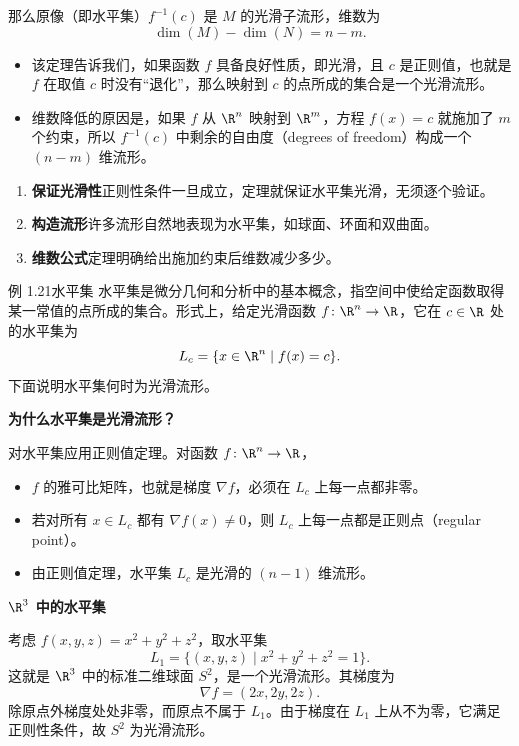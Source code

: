 那么原像（即水平集）$f^{-1}(c)$ 是 $M$ 的光滑子流形，维数为
\[
  \dim(M)-\dim(N)=n-m.
\]

\begin{itemize}
  \item 该定理告诉我们，如果函数 $f$ 具备良好性质，即光滑，且 $c$ 是正则值，也就是 $f$ 在取值 $c$ 时没有“退化”，那么映射到 $c$ 的点所成的集合是一个光滑流形。
  \item 维数降低的原因是，如果 $f$ 从 $\R^n$ 映射到 $\R^m$，方程 $f(x)=c$ 就施加了 $m$ 个约束，所以 $f^{-1}(c)$ 中剩余的自由度（degrees of freedom）构成一个 $(n-m)$ 维流形。
\end{itemize}

\begin{enumerate}
  \item \textbf{保证光滑性}\quad 正则性条件一旦成立，定理就保证水平集光滑，无须逐个验证。
  \item \textbf{构造流形}\quad 许多流形自然地表现为水平集，如球面、环面和双曲面。
  \item \textbf{维数公式}\quad 定理明确给出施加约束后维数减少多少。
\end{enumerate}

\begin{statement}{例 1.21}{水平集}
水平集是微分几何和分析中的基本概念，指空间中使给定函数取得某一常值的点所成的集合。形式上，给定光滑函数 $f\colon\R^n\to\R$，它在 $c\in\R$ 处的水平集为
\[
  L_c=\{x\in\R^n\mid f(x)=c\}.
\]
下面说明水平集何时为光滑流形。

\textbf{为什么水平集是光滑流形？}\par
对水平集应用正则值定理。对函数 $f\colon\R^n\to\R$，
\begin{itemize}
  \item $f$ 的雅可比矩阵，也就是梯度 $\nabla f$，必须在 $L_c$ 上每一点都非零。
  \item 若对所有 $x\in L_c$ 都有 $\nabla f(x)\ne0$，则 $L_c$ 上每一点都是正则点（regular point）。
  \item 由正则值定理，水平集 $L_c$ 是光滑的 $(n-1)$ 维流形。
\end{itemize}

\textbf{$\R^3$ 中的水平集}\par
考虑 $f(x,y,z)=x^2+y^2+z^2$，取水平集
\[
  L_1=\{(x,y,z)\mid x^2+y^2+z^2=1\}.
\]
这就是 $\R^3$ 中的标准二维球面 $S^2$，是一个光滑流形。其梯度为
\[
  \nabla f=(2x,2y,2z).
\]
除原点外梯度处处非零，而原点不属于 $L_1$。由于梯度在 $L_1$ 上从不为零，它满足正则性条件，故 $S^2$ 为光滑流形。
\end{statement}

